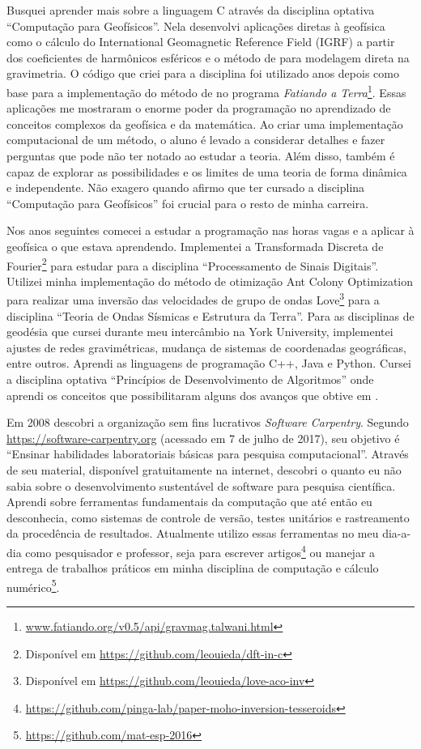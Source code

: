 Busquei aprender mais sobre a linguagem C através da disciplina optativa
``Computação para Geofísicos''.
Nela desenvolvi aplicações diretas à geofísica como o cálculo do International
Geomagnetic Reference Field (IGRF) a partir dos coeficientes de harmônicos
esféricos e o método de \citet{talwani1959} para modelagem direta na
gravimetria.
O código que criei para a disciplina foi utilizado anos depois como base
para a implementação do método de \citet{talwani1959} no programa
\textit{Fatiando a
Terra}\footnote{\url{www.fatiando.org/v0.5/api/gravmag.talwani.html}}.
Essas aplicações me mostraram o enorme poder da programação no aprendizado de
conceitos complexos da geofísica e da matemática.
Ao criar uma implementação computacional de um método, o aluno é levado a
considerar detalhes e fazer perguntas que pode não ter notado ao estudar a
teoria.
Além disso, também é capaz de explorar as possibilidades e os limites de uma
teoria de forma dinâmica e independente.
Não exagero quando afirmo que ter cursado a disciplina ``Computação para
Geofísicos'' foi crucial para o resto de minha carreira.

Nos anos seguintes comecei a estudar a programação nas horas vagas e a aplicar
à geofísica o que estava aprendendo.
Implementei a Transformada Discreta de Fourier\footnote{Disponível em
\url{https://github.com/leouieda/dft-in-c}} para estudar para a disciplina
``Processamento de Sinais Digitais''.
Utilizei minha implementação do método de otimização Ant Colony Optimization
\citep{socha2008} para realizar uma inversão das velocidades de grupo de ondas
Love\footnote{Disponível em \url{https://github.com/leouieda/love-aco-inv}}
para a disciplina ``Teoria de Ondas Sísmicas e Estrutura da Terra''.
Para as disciplinas de geodésia que cursei durante meu intercâmbio na York
University, implementei ajustes de redes gravimétricas, mudança de sistemas de
coordenadas geográficas, entre outros.
Aprendi as linguagens de programação C++, Java e Python.
Cursei a disciplina optativa ``Princípios de Desenvolvimento de Algoritmos''
onde aprendi os conceitos que possibilitaram alguns dos avanços que obtive em
\citet{tesseroids}.

Em 2008 descobri a organização sem fins lucrativos \textit{Software Carpentry}.
Segundo \url{https://software-carpentry.org} (acessado em 7 de julho de 2017),
seu objetivo é ``Ensinar habilidades laboratoriais básicas para pesquisa
computacional''.
Através de seu material, disponível gratuitamente na internet, descobri o
quanto eu não sabia sobre o desenvolvimento sustentável de software para
pesquisa científica.
Aprendi sobre ferramentas fundamentais da computação que até então eu
desconhecia, como sistemas de controle de versão, testes unitários e
rastreamento da procedência de resultados.
Atualmente utilizo essas ferramentas no meu dia-a-dia como pesquisador e
professor, seja para escrever
artigos\footnote{\url{https://github.com/pinga-lab/paper-moho-inversion-tesseroids}}
ou manejar a entrega de trabalhos práticos em minha disciplina de computação e
cálculo numérico\footnote{\url{https://github.com/mat-esp-2016}}.


